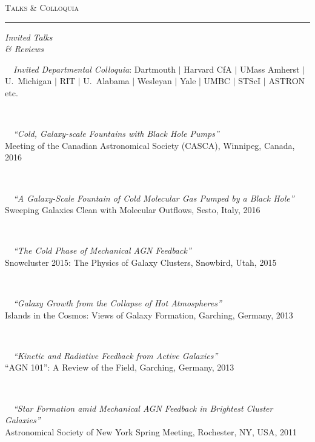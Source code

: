 \documentclass[11pt]{article}
\makeatletter
\def\vhrulefill#1{\leavevmode\leaders\hrule\@height#1\hfill \kern\z@}
\makeatother
\begin{document}
\vspace{4mm}



\textsc{Talks \& Colloquia} \vhrulefill{0.4pt}

\vspace{4mm}

\hspace{2.5mm} \parbox{1.5in}{\textit{Invited Talks \\ \& Reviews }}
\parbox{5.15in}{
\textbullet~~\textit{Invited Departmental Colloquia}: Dartmouth $|$ Harvard CfA $|$ UMass Amherst $|$ U.~Michigan $|$ RIT $|$ U.~Alabama $|$ Wesleyan $|$ Yale $|$ UMBC $|$ STScI $|$ ASTRON etc.} \\


\hspace{42mm} \parbox{5.15in}{
\textbullet~~\textit{``Cold, Galaxy-scale Fountains with Black Hole Pumps''}\\ Meeting of the Canadian Astronomical Society (CASCA), Winnipeg, Canada, 2016}\\


\hspace{42mm} \parbox{5.15in}{
\textbullet~~\textit{``A Galaxy-Scale Fountain of Cold Molecular Gas Pumped by a Black Hole''}\\ Sweeping Galaxies Clean with Molecular Outflows, Sesto, Italy, 2016}\\



\hspace{42mm} \parbox{5.15in}{
\textbullet~~\textit{``The Cold Phase of Mechanical AGN Feedback''}\\ Snowcluster 2015: The Physics of Galaxy Clusters, Snowbird, Utah, 2015}\\


\hspace{42mm} \parbox{5.15in}{
\textbullet~~\textit{``Galaxy Growth from the Collapse of Hot Atmospheres''}\\ Islands in the Cosmos: Views of Galaxy Formation, Garching, Germany, 2013}\\

\hspace{42mm} \parbox{5.15in}{
\textbullet~~\textit{``Kinetic and Radiative Feedback from Active Galaxies''} \\ ``AGN 101'': A Review of the Field, Garching, Germany, 2013}\\


\hspace{42mm} \parbox{5.15in}{
\textbullet~~\textit{``Star Formation amid Mechanical AGN Feedback in Brightest Cluster Galaxies''}\\ Astronomical Society of New York Spring Meeting, Rochester, NY, USA, 2011}\\
\end{document}
